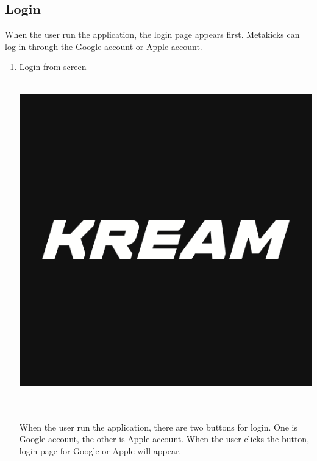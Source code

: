 \documentclass[conference]{IEEEtran}
\begin{document}
\subsection{Login}
When the user run the application, the login page appears first. Metakicks can log in through the Google account or Apple account. \\
\begin{enumerate}
    \item Login from screen\\\\
\centerline{\includegraphics[scale=0.2]{pics/KREAM.png}}\\
\\When the user run the application, there are two buttons for login. One is Google account, the other is Apple account. When the user clicks the button, login page for Google or Apple will appear. \\


\end{enumerate}
\end{document}
